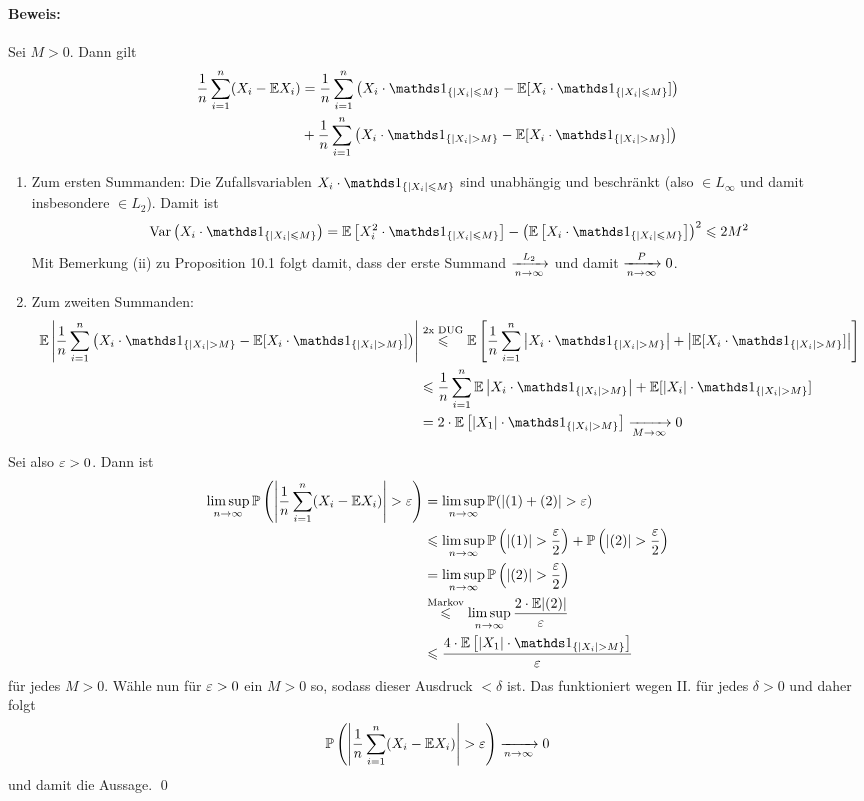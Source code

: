 \documentclass[11pt]{report}
\begin{document}
\paragraph{Beweis:} Sei $M>0$. Dann gilt
\begin{align*}
    \dfrac{1}{n}\sum_{i=1}^n(X_i-\E X_i)
    &=\dfrac{1}{n}\sum_{i=1}^n\left(X_i\cdot\ind{\{|X_i|\leq M\}}-\E [X_i\cdot\ind{\{|X_i|\leq M\}}]\right)\\
    &+\dfrac{1}{n}\sum_{i=1}^n\left(X_i\cdot\ind{\{|X_i|> M\}}-\E[ X_i\cdot\ind{\{|X_i|> M\}}]\right)
\end{align*}
\begin{enumerate}[label=\Roman*.]
    \item Zum ersten Summanden: \newline
    Die Zufallsvariablen $X_i\cdot\ind{\{|X_i|\leq M\}}$ sind unabhängig und beschränkt (also $\in L_\infty$ und damit insbesondere $\in L_2$). Damit ist
    $$\Var\left(X_i\cdot\ind{\{|X_i|\leq M\}}\right)=\E\left[X_i^2\cdot\ind{\{|X_i|\leq M\}}\right]-\left(\E\left[X_i\cdot\ind{\{|X_i|\leq M\}}\right]\right)^2\leq 2M^2$$
    Mit Bemerkung (ii) zu Proposition 10.1 folgt damit, dass der erste Summand $\nto{L_2}{n\to\infty}$ und damit $\nto{P}{n\to\infty}0$.
    \item Zum zweiten Summanden:\newline
    \begin{align*}
        \E\left|\dfrac{1}{n}\sum_{i=1}^n\left(X_i\cdot\ind{\{|X_i|> M\}}-\E[ X_i\cdot\ind{\{|X_i|> M\}}]\right)\right|
        &\overset{\text{2x DUG}}{\leq}
        \E\left[\dfrac{1}{n}\sum_{i=1}^n\left|X_i\cdot\ind{\{|X_i|> M\}}\right|+\left|\E[ X_i\cdot\ind{\{|X_i|> M\}}]\right|\right]\\
        &\leq\dfrac{1}{n}\sum_{i=1}^n\E\left|X_i\cdot\ind{\{|X_i|>M\}}\right|+\E[ |X_i|\cdot\ind{\{|X_i|> M\}}]\\
        &=2\cdot\E\left[|X_1|\cdot\ind{\{|X_i|>M\}}\right]\nto{}{M\to\infty}0
    \end{align*}
\end{enumerate}
Sei also $\varepsilon>0$. Dann ist
\begin{align*}
    \limsup_{n\to\infty}\Pp\left(\left|\dfrac{1}{n}\sum_{i=1}^n(X_i-\E X_i)\right|>\eps\right)&=\limsup_{n\to\infty}\Pp(|(1)+(2)|>\eps)\\
    &\leq\limsup_{n\to\infty}\Pp\left(|(1)|>\dfrac{\eps}{2}\right)+\Pp\left(|(2)|>\dfrac{\eps}{2}\right)\\
    &=\limsup_{n\to\infty}\Pp\left(|(2)|>\dfrac{\eps}{2}\right)\\
    &\overset{\text{Markov}}{\leq}\limsup_{n\to\infty}\dfrac{2\cdot\E|(2)|}{\eps}\\
    &\leq\dfrac{4\cdot\E\left[|X_1|\cdot\ind{\{|X_i|>M\}}\right]}{\eps}
\end{align*}
für jedes $M>0$. Wähle nun für $\varepsilon>0$ ein $M>0$ so, sodass dieser Ausdruck $<\delta$ ist. Das funktioniert wegen II. für jedes $\delta>0$ und daher folgt 
$$\Pp\left(\left|\dfrac{1}{n}\sum_{i=1}^n(X_i-\E X_i)\right|>\eps\right)\nto{}{n\to\infty}0$$
und damit die Aussage. \qed
\end{document}
